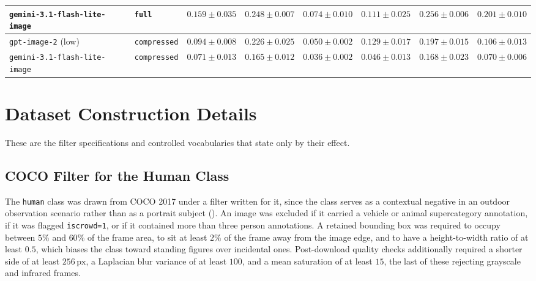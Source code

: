\begin{table}[p]
\begin{adjustbox}{max width=\textwidth}
\begin{tabular}{@{}llrrrrrr@{}}
    \texttt{gemini-3.1-flash-lite-image} & \texttt{full} & $0.159 \pm 0.035$ & $0.248 \pm 0.007$ & $0.074 \pm 0.010$ & $0.111 \pm 0.025$ & $0.256 \pm 0.006$ & $0.201 \pm 0.010$ \\
    \midrule
    \texttt{gpt-image-2} (low) & \texttt{compressed} & $0.094 \pm 0.008$ & $0.226 \pm 0.025$ & $0.050 \pm 0.002$ & $0.129 \pm 0.017$ & $0.197 \pm 0.015$ & $0.106 \pm 0.013$ \\
    \texttt{gemini-3.1-flash-lite-image} & \texttt{compressed} & $0.071 \pm 0.013$ & $0.165 \pm 0.012$ & $0.036 \pm 0.002$ & $0.046 \pm 0.013$ & $0.168 \pm 0.023$ & $0.070 \pm 0.006$ \\
    \bottomrule
\end{tabular}
\end{adjustbox}
\end{table}

\section{Dataset Construction Details}\label{sec:appendix_data_details}

These are the filter specifications and controlled vocabularies that  state only by their effect.

\subsection{COCO Filter for the Human Class}\label{sec:appendix_human_filter}

The \texttt{human} class was drawn from COCO 2017 under a filter written for it, since the class serves as a contextual negative in an outdoor observation scenario rather than as a portrait subject (). An image was excluded if it carried a vehicle or animal supercategory annotation, if it was flagged \texttt{iscrowd=1}, or if it contained more than three person annotations. A retained bounding box was required to occupy between $5\%$ and $60\%$ of the frame area, to sit at least $2\%$ of the frame away from the image edge, and to have a height-to-width ratio of at least $0.5$, which biases the class toward standing figures over incidental ones. Post-download quality checks additionally required a shorter side of at least $256\,\mathrm{px}$, a Laplacian blur variance of at least $100$, and a mean saturation of at least $15$, the last of these rejecting grayscale and infrared frames.  %

